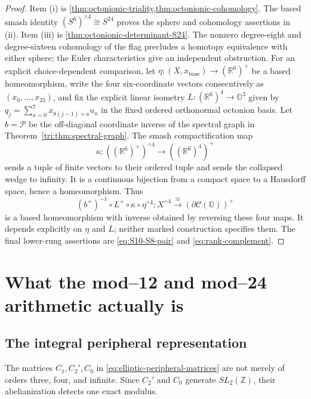 \documentclass[11pt]{article}
\theoremstyle{definition}
\newcommand{\R}{\mathbb R}
\newcommand{\Z}{\mathbb Z}
\newcommand{\Oo}{\mathbb O}
\begin{document}
\begin{proof}
Item (i) is \cref{thm:octonionic-triality,thm:octonionic-cohomology}.
The based smash identity
\((S^6)^{\wedge4}\cong S^{24}\) proves the sphere and cohomology assertions
in (ii).  Item (iii) is
\cref{thm:octonionic-determinant-S24}.  The nonzero degree-eight and
degree-sixteen cohomology of the flag precludes a homotopy equivalence with
either sphere; the Euler characteristics give an independent obstruction.
For an explicit choice-dependent comparison, let
\(\eta:(X,x_{\mathrm{base}})\to(\R^6)^+\) be a based homeomorphism,
write the four six-coordinate vectors consecutively as
$(x_0,\ldots,x_{23})$, and fix the explicit linear isometry
$L:(\mathbb R^6)^4\to\mathbb O^3$ given by
$q_j=\sum_{a=0}^7x_{8(j-1)+a}u_a$ in the fixed ordered orthonormal
octonion basis. Let $b=\mathcal P$ be the off-diagonal coordinate inverse
of the spectral graph in Theorem~\ref{tri:thm:spectral-graph}.
The smash compactification map
\[
 \kappa:((\R^6)^+)^{\wedge4}\longrightarrow((\R^6)^4)^+
\]
sends a tuple of finite vectors to their ordered tuple and sends the
collapsed wedge to infinity.  It is a continuous bijection from a compact
space to a Hausdorff space, hence a homeomorphism.  Thus
\[
 (b^+)^{-1}\circ L^+\circ\kappa\circ\eta^{\wedge4}:
 X^{\wedge4}\xrightarrow{\ \cong\ }
       (\partial\mathcal C(\Oo))^+
\]
is a based homeomorphism with inverse obtained by reversing these four
maps.  It depends explicitly on \(\eta\) and \(L\); neither marked
construction specifies them.  The final
lower-rung assertions are \eqref{eq:S10-S8-pair} and
\eqref{eq:rank-complement}.
\end{proof}

\section{What the mod--12 and mod--24 arithmetic actually is}
\label{sec:mod-12-24}

\subsection{The integral peripheral representation}

The matrices \(C_1,C_2',C_0\) in
\eqref{eq:elliptic-peripheral-matrices} are not merely of orders three,
four, and infinite.  Since \(C_2'\) and \(C_0\) generate
\(SL_2(\Z)\), their abelianization detects one exact modulus.
\end{document}
